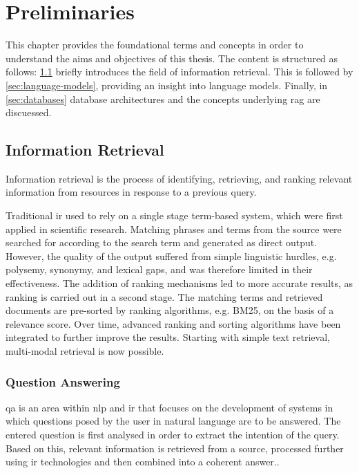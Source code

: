 \chapter{Preliminaries}\label{ch:preliminaries}
This chapter provides the foundational terms and concepts in order to understand the aims and objectives of this thesis.
%
The content is structured as follows: \cref{sec:information retrieval} briefly introduces the field of information retrieval. This is followed by \cref{sec:language-models}, providing an insight into language models. 
Finally, in \cref{sec:databases} database architectures and the concepts underlying \ac{rag} are discuessed. 
%
\section{Information Retrieval}\label{sec:information retrieval}
\begin{definition}\label{def:information retrieval}
Information retrieval is the process of identifying, retrieving, and ranking relevant information from resources in response to a previous query. 
\end{definition}
%
Traditional \ac{ir} used to rely on a single stage term-based system, which were first applied in scientific research. Matching phrases and terms from the source were searched for according to the search term and generated as direct output.
However, the quality of the output suffered from simple linguistic hurdles, e.g. polysemy, synonymy, and lexical gaps, and was therefore limited in their effectiveness. 
The addition of ranking mechanisms led to more accurate results, as ranking is carried out in a second stage. 
The matching terms and retrieved documents are pre-sorted by ranking algorithms, e.g. BM25, on the basis of a relevance score. 
Over time, advanced ranking and sorting algorithms have been integrated to further improve the results. \citep{hambardeIR2023}
Starting with simple text retrieval, multi-modal retrieval is now possible.
%
\subsection{Question Answering}\label{subsec:question answering}
\begin{definition}
\ac{qa} is an area within \ac{nlp} and \ac{ir} that focuses on the development of systems in which questions posed by the user in natural language are to be answered. 
The entered question is first analysed in order to extract the intention of the query. 
Based on this, relevant information is retrieved from a source, processed further using \ac{ir} technologies and then combined into a coherent answer.\citep{Manning2008}.
\end{definition}
%
